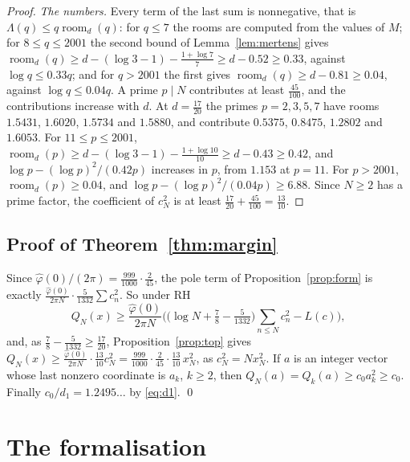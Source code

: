 \documentclass[11pt]{article}
\theoremstyle{definition}
\begin{document}
\begin{proof}
\emph{The numbers.} Every term of the last sum is nonnegative, that is $\Lambda(q) \le q \operatorname{room}_d(q)$: for
$q \le 7$ the rooms are computed from the values of $M$; for $8 \le q \le 2001$ the second bound of
Lemma~\ref{lem:mertens} gives $\operatorname{room}_d(q) \ge d - (\log 3 - 1) - \frac{1 + \log 7}{7} \ge d - 0.52 \ge
0.33$, against $\log q \le 0.33q$; and for $q > 2001$ the first gives $\operatorname{room}_d(q) \ge d - 0.81 \ge 0.04$,
against $\log q \le 0.04q$. A prime $p \mid N$ contributes at least $\frac{45}{100}$, and the contributions increase
with $d$. At $d = \frac{17}{20}$ the primes $p = 2, 3, 5, 7$ have rooms $1.5431$, $1.6020$, $1.5734$ and $1.5880$, and
contribute $0.5375$, $0.8475$, $1.2802$ and $1.6053$. For $11 \le p \le 2001$, $\operatorname{room}_d(p) \ge d - (\log 3
- 1) - \frac{1 + \log 10}{10} \ge d - 0.43 \ge 0.42$, and $\log p - (\log p)^2/(0.42p)$ increases in $p$, from $1.153$
at $p = 11$. For $p > 2001$, $\operatorname{room}_d(p) \ge 0.04$, and $\log p - (\log p)^2/(0.04p) \ge 6.88$. Since $N
\ge 2$ has a prime factor, the coefficient of $c_N^2$ is at least $\frac{17}{20} + \frac{45}{100} = \frac{13}{10}$.
\end{proof}

\subsection{Proof of Theorem~\ref{thm:margin}}

Since $\hat\varphi(0)/(2\pi) = \frac{999}{1000} \cdot \frac{2}{45}$, the pole term of Proposition~\ref{prop:form} is
exactly $\frac{\hat\varphi(0)}{2\pi N} \cdot \frac{5}{1332} \sum c_n^2$. So under RH
\[
Q_N(x) \ge \frac{\hat\varphi(0)}{2\pi N}\Big(\big(\log N + \tfrac78 - \tfrac{5}{1332}\big) \sum_{n \le N} c_n^2 -
L(c)\Big),
\]
and, as $\frac78 - \frac{5}{1332} \ge \frac{17}{20}$, Proposition~\ref{prop:top} gives $Q_N(x) \ge
\frac{\hat\varphi(0)}{2\pi N} \cdot \frac{13}{10} c_N^2 =
\frac{999}{1000} \cdot \frac{2}{45} \cdot \frac{13}{10}\, x_N^2$, as $c_N^2 = N x_N^2$. If $a$ is an integer vector
whose last nonzero coordinate is $a_k$, $k \ge 2$, then $Q_N(a) = Q_k(a) \ge c_0 a_k^2 \ge c_0$. Finally $c_0/d_1 =
1.2495\ldots$ by \eqref{eq:d1}. \qed

\section{The formalisation}\label{sec:lean}
\end{document}
